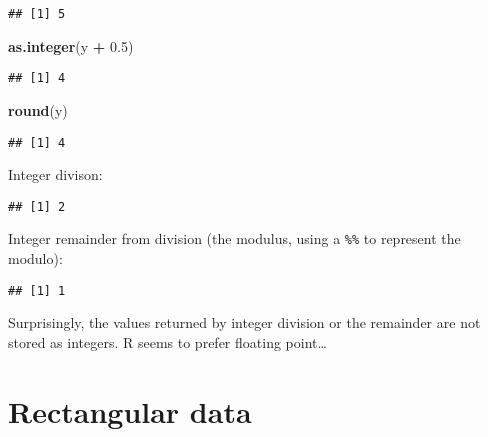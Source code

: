 \documentclass[
]{book}
\newenvironment{Shaded}{\begin{snugshade}}{\end{snugshade}}
\newcommand{\DecValTok}[1]{\textcolor[rgb]{0.00,0.00,0.81}{#1}}
\newcommand{\FloatTok}[1]{\textcolor[rgb]{0.00,0.00,0.81}{#1}}
\newcommand{\KeywordTok}[1]{\textcolor[rgb]{0.13,0.29,0.53}{\textbf{#1}}}
\newcommand{\NormalTok}[1]{#1}
\newcommand{\OperatorTok}[1]{\textcolor[rgb]{0.81,0.36,0.00}{\textbf{#1}}}
\newcommand{\StringTok}[1]{\textcolor[rgb]{0.31,0.60,0.02}{#1}}
\begin{document}
\begin{verbatim}
## [1] 5
\end{verbatim}

\begin{Shaded}
\begin{Highlighting}[]
\KeywordTok{as.integer}\NormalTok{(y }\OperatorTok{+}\StringTok{ }\FloatTok{0.5}\NormalTok{)}
\end{Highlighting}
\end{Shaded}

\begin{verbatim}
## [1] 4
\end{verbatim}

\begin{Shaded}
\begin{Highlighting}[]
\KeywordTok{round}\NormalTok{(y)}
\end{Highlighting}
\end{Shaded}

\begin{verbatim}
## [1] 4
\end{verbatim}

Integer divison:

\begin{Shaded}
\end{Shaded}

\begin{verbatim}
## [1] 2
\end{verbatim}

Integer remainder from division (the modulus, using a \texttt{\%\%} to represent the modulo):

\begin{Shaded}
\end{Shaded}

\begin{verbatim}
## [1] 1
\end{verbatim}

Surprisingly, the values returned by integer division or the remainder are not stored as integers. R seems to prefer floating point\ldots{}

\hypertarget{rectangular-data}{%
\section{Rectangular data}\label{rectangular-data}}
\end{document}
